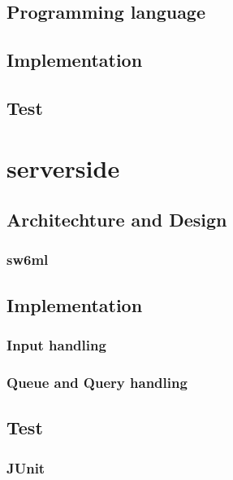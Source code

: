      \subsection{Programming language}
      
     \subsection{Implementation}
     	
     \subsection{Test}
		

  \section{serverside} %
    
    \subsection{Architechture and Design}
      \label{sect:ssArchAndDesign}
      
      \subsubsection{sw6ml} %
         \label{sw6ml}
	  
	  
    \subsection{Implementation}
      \subsubsection{Input handling} %
		
      \subsubsection{Queue and Query handling} %
	  \label{QQHandling}
	    
    \subsection{Test}
	
      \subsubsection{JUnit}
	
	
